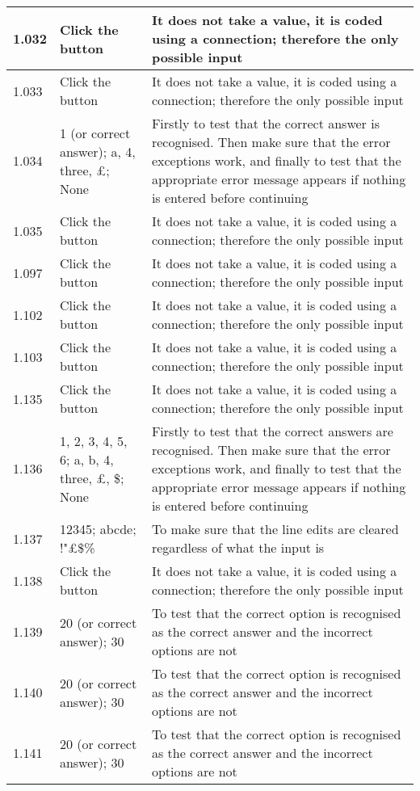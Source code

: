 \begin{landscape}
\begin{center}
\begin{longtable}{|p{4cm}|p{4cm}|p{5cm}|}
1.032 & Click the button & It does not take a value, it is coded using a connection; therefore the only possible input \\ \hline
1.033 & Click the button & It does not take a value, it is coded using a connection; therefore the only possible input \\ \hline
1.034 & 1 (or correct answer); a, 4, three, £; None & Firstly to test that the correct answer is recognised. Then make sure that the error exceptions work, and finally to test that the appropriate error message appears if nothing is entered before continuing \\ \hline
1.035 & Click the button & It does not take a value, it is coded using a connection; therefore the only possible input \\ \hline
1.097 & Click the button & It does not take a value, it is coded using a connection; therefore the only possible input \\ \hline
1.102 & Click the button & It does not take a value, it is coded using a connection; therefore the only possible input \\ \hline
1.103 & Click the button & It does not take a value, it is coded using a connection; therefore the only possible input \\ \hline
1.135 & Click the button & It does not take a value, it is coded using a connection; therefore the only possible input \\ \hline
1.136 & 1, 2, 3, 4, 5, 6; a, b, 4, three, £, \$; None & Firstly to test that the correct answers are recognised. Then make sure that the error exceptions work, and finally to test that the appropriate error message appears if nothing is entered before continuing \\ \hline
1.137 & 12345; abcde; !"£\$\% & To make sure that the line edits are cleared regardless of what the input is \\ \hline
1.138 & Click the button & It does not take a value, it is coded using a connection; therefore the only possible input \\ \hline
1.139 & 20 (or correct answer); 30 & To test that the correct option is recognised as the correct answer and the incorrect options are not \\ \hline
1.140 & 20 (or correct answer); 30 & To test that the correct option is recognised as the correct answer and the incorrect options are not \\ \hline
1.141 & 20 (or correct answer); 30 & To test that the correct option is recognised as the correct answer and the incorrect options are not \\ \hline

\end{longtable}
\end{center}
\end{landscape}
